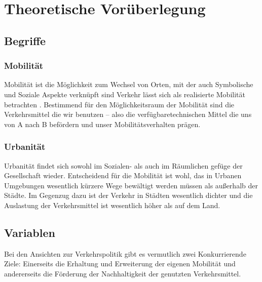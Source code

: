 
\section{Theoretische Vorüberlegung}

\subsection{Begriffe}
\subsubsection*{Mobilität}

Mobilität ist die Möglichkeit zum Wechsel von Orten, mit der auch Symbolische und Soziale Aspekte verknüpft sind Verkehr lässt sich als realisierte Mobilität betrachten \parencite[6]{fh7}.
Bestimmend für den Möglichkeitsraum der Mobilität sind die Verkehrsmittel die wir benutzen – also die verfügbaretechnischen Mittel die uns von A nach B befördern und unser Mobilitätsverhalten prägen.

\subsubsection*{Urbanität}
Urbanität findet sich sowohl im Sozialen- als auch im Räumlichen gefüge der Gesellschaft wieder.
Entscheidend für die Mobilität ist wohl, das in Urbanen Umgebungen wesentlich kürzere Wege bewältigt werden müssen als außerhalb der Städte.
Im Gegenzug dazu ist der Verkehr in Städten wesentlich dichter und die Auslastung der Verkehrsmittel ist wesentlich höher als auf dem Land.

\subsection{Variablen}

Bei den Ansichten zur Verkehrspolitik gibt es vermutlich zwei Konkurrierende Ziele: Einerseits die Erhaltung und Erweiterung der eigenen Mobilität und andererseits die Förderung der Nachhaltigkeit der genutzten Verkehrsmittel.


